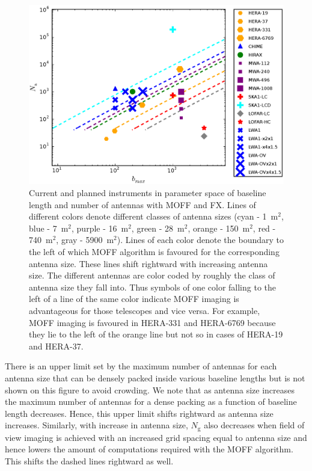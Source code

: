 \documentclass[a4paper,fleqn,usenatbib]{mnras}
\newcommand{\Ngrid}{N_\textrm{g}}
\begin{document}
\begin{figure}
  \includegraphics[width=\columnwidth]{figure12}
  \caption{Current and planned instruments in parameter space of baseline length and number of antennas with MOFF and FX. Lines of different colors denote different classes of antenna sizes (cyan - 1~m$^2$, blue - 7~m$^2$, purple - 16~m$^2$, green - 28~m$^2$, orange - 150~m$^2$, red - 740~m$^2$, gray - 5900~m$^2$). Lines of each color denote the boundary to the left of which MOFF algorithm is favoured for the corresponding antenna size. These lines shift rightward with increasing antenna size. The different antennas are color coded by roughly the class of antenna size they fall into. Thus symbols of one color falling to the left of a line of the same color indicate MOFF imaging is advantageous for those telescopes and vice versa. For example, MOFF imaging is favoured in HERA-331 and HERA-6769 because they lie to the left of the orange line but not so in cases of HERA-19 and HERA-37.}
  \label{fig:parameter-space-bll-nant-instruments}
\end{figure}

There is an upper limit set by the maximum number of antennas for each antenna size that can be densely packed inside various baseline lengths but is not shown on this figure to avoid crowding. We note that as antenna size increases the maximum number of antennas for a dense packing as a function of baseline length decreases. Hence, this upper limit shifts rightward as antenna size increases. Similarly, with increase in antenna size, $\Ngrid$ also decreases when field of view imaging is achieved with an increased grid spacing equal to antenna size and hence lowers the amount of computations required with the MOFF algorithm. This shifts the dashed lines rightward as well.
\end{document}
